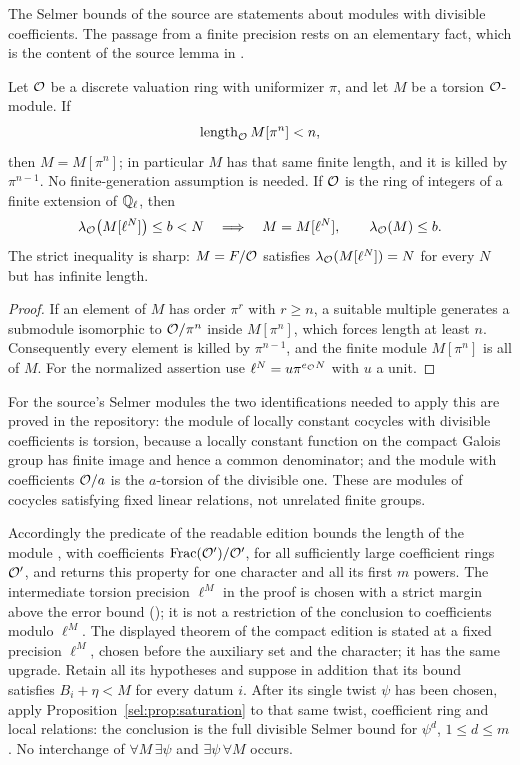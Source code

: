 The Selmer bounds of the source are statements about modules with divisible
coefficients. The passage from a finite precision rests on an elementary
fact, which is the content of the source lemma
 in .

\begin{proposition}\label{sel:prop:saturation}
Let $\mathcal{O}$ be a discrete valuation ring with uniformizer $\pi$, and let $M$
be a torsion $\mathcal{O}$-module. If
\[
 \operatorname{length}_{\mathcal{O}}M[\pi^n]<n,
\]
then $M=M[\pi^n]$; in particular $M$ has that same finite length, and it is
killed by $\pi^{n-1}$. No finite-generation assumption is needed. If $\mathcal{O}$
is the ring of integers of a finite extension of $\mathbb{Q}_\ell$, then
\[
 \lambda_{\mathcal{O}}\bigl(M[\ell^N]\bigr)\le b<N
 \quad\Longrightarrow\quad M=M[\ell^N],\qquad\lambda_{\mathcal{O}}(M)\le b .
\]
The strict inequality is sharp: $M=F/\mathcal{O}$ satisfies
$\lambda_{\mathcal{O}}(M[\ell^N])=N$ for every $N$ but has infinite length.
\end{proposition}

\begin{proof}
If an element of $M$ has order $\pi^r$ with $r\ge n$, a suitable multiple
generates a submodule isomorphic to $\mathcal{O}/\pi^n$ inside $M[\pi^n]$, which
forces length at least $n$. Consequently every element is killed by
$\pi^{n-1}$, and the finite module $M[\pi^n]$ is all of $M$. For the
normalized assertion use $\ell^N=u\pi^{e_{\mathcal{O}}N}$ with $u$ a unit.
\end{proof}

For the source's Selmer modules the two identifications needed to apply
this are proved in the repository: the module of locally constant cocycles
with divisible coefficients is torsion, because a locally constant function
on the compact Galois group has finite image and hence a common
denominator; and the module with coefficients $\mathcal{O}/a$ is the $a$-torsion of
the divisible one. These are modules of cocycles satisfying fixed linear
relations, not unrelated finite groups.

Accordingly the predicate  of the readable edition
bounds the length of the module , with coefficients
$\operatorname{Frac}(\mathcal{O}')/\mathcal{O}'$, for all sufficiently large coefficient
rings $\mathcal{O}'$, and  returns this property
for one character and all its first $m$ powers. The intermediate torsion
precision $\ell^M$ in the proof is chosen with a strict margin above the
error bound (); it is not a restriction of the
conclusion to coefficients modulo $\ell^M$. The displayed theorem of the
compact edition is stated at a fixed precision $\ell^M$, chosen before the
auxiliary set and the character; it has the same upgrade. Retain all its
hypotheses and suppose in addition that its bound satisfies $B_i+\eta<M$
for every datum $i$. After its single twist $\psi$ has been chosen, apply
Proposition~\ref{sel:prop:saturation} to that same twist, coefficient ring and local
relations: the conclusion is the full divisible Selmer bound for $\psi^d$,
$1\le d\le m$. No interchange of $\forall M\,\exists\psi$ and
$\exists\psi\,\forall M$ occurs.


